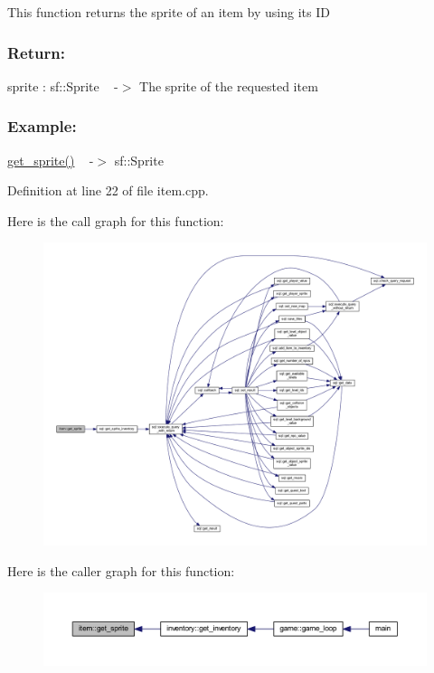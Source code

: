 This function returns the sprite of an item by using its ID

\subsubsection*{Return\+: }

sprite \+: sf\+::\+Sprite ~\newline
-\/$>$ The sprite of the requested item

\subsubsection*{Example\+: }

\hyperlink{classitem_aafc61a4b7e2bd10300a6767e6dd7281e}{get\+\_\+sprite()} ~\newline
-\/$>$ sf\+::\+Sprite 

Definition at line 22 of file item.\+cpp.

Here is the call graph for this function\+:
\nopagebreak
\begin{figure}[H]
\begin{center}
\leavevmode
\includegraphics[width=350pt]{classitem_aafc61a4b7e2bd10300a6767e6dd7281e_cgraph}
\end{center}
\end{figure}
Here is the caller graph for this function\+:
\nopagebreak
\begin{figure}[H]
\begin{center}
\leavevmode
\includegraphics[width=350pt]{classitem_aafc61a4b7e2bd10300a6767e6dd7281e_icgraph}
\end{center}
\end{figure}


